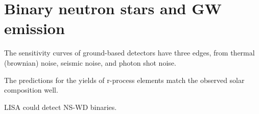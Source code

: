 \documentclass[main.tex]{subfiles}
\begin{document}
\section{Binary neutron stars and GW emission}


The sensitivity curves of ground-based detectors have three edges, from thermal (brownian) noise, seismic noise, and photon shot noise. 

The predictions for the yields of r-process elements match the observed solar composition well. 

LISA could detect NS-WD binaries. 
\end{document}
